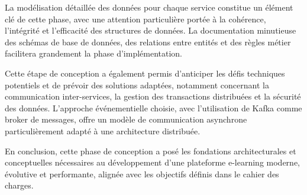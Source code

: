 La modélisation détaillée des données pour chaque service constitue un élément clé de cette phase, avec une attention particulière portée à la cohérence, l'intégrité et l'efficacité des structures de données. La documentation minutieuse des schémas de base de données, des relations entre entités et des règles métier facilitera grandement la phase d'implémentation.

Cette étape de conception a également permis d'anticiper les défis techniques potentiels et de prévoir des solutions adaptées, notamment concernant la communication inter-services, la gestion des transactions distribuées et la sécurité des données. L'approche événementielle choisie, avec l'utilisation de Kafka comme broker de messages, offre un modèle de communication asynchrone particulièrement adapté à une architecture distribuée.

En conclusion, cette phase de conception a posé les fondations architecturales et conceptuelles nécessaires au développement d'une plateforme e-learning moderne, évolutive et performante, alignée avec les objectifs définis dans le cahier des charges. 